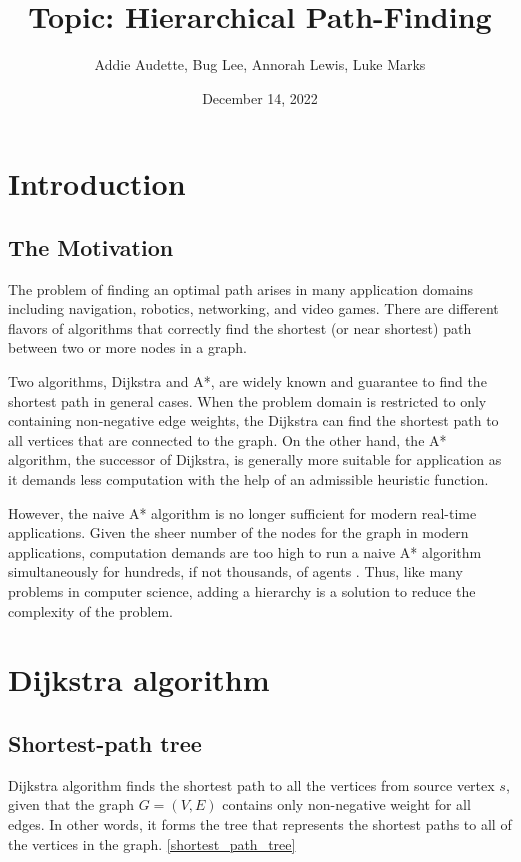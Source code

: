 \documentclass{article}
\title{Topic: Hierarchical Path-Finding}
\author{Addie Audette, Bug Lee, Annorah Lewis, Luke Marks}
\date{December 14, 2022}
\begin{document}
\maketitle

\section{Introduction}
\subsection{The Motivation}
The problem of finding an optimal path arises in many application domains including navigation, robotics, networking, and video games. There are different flavors of algorithms that correctly find the shortest (or near shortest) path between two or more nodes in a graph.  

Two algorithms, Dijkstra and A*, are widely known and guarantee to find the shortest path in general cases. When the problem domain is restricted to only containing non-negative edge weights, the Dijkstra can find the shortest path to all vertices that are connected to the graph\cite{Erickson}. On the other hand, the A* algorithm, the successor of Dijkstra, is generally more suitable for application as it demands less computation with the help of an admissible heuristic function.

However, the naive A* algorithm is no longer sufficient for modern real-time applications. Given the sheer number of the nodes for the graph in modern applications, computation demands are too high to run a naive A* algorithm simultaneously for hundreds, if not thousands, of agents \cite{Botea2004NearOH}. Thus, like many problems in computer science, adding a hierarchy is a solution to reduce the complexity of the problem.


\section{Dijkstra algorithm}
\subsection{Shortest-path tree}
Dijkstra algorithm finds the shortest path to all the vertices from source vertex $s$, given that the graph $G = (V, E)$ contains only non-negative weight for all edges\cite{CLRS}. In other words, it forms the tree that represents the shortest paths to all of the vertices in the graph. 
\autoref{shortest_path_tree}
\end{document}
